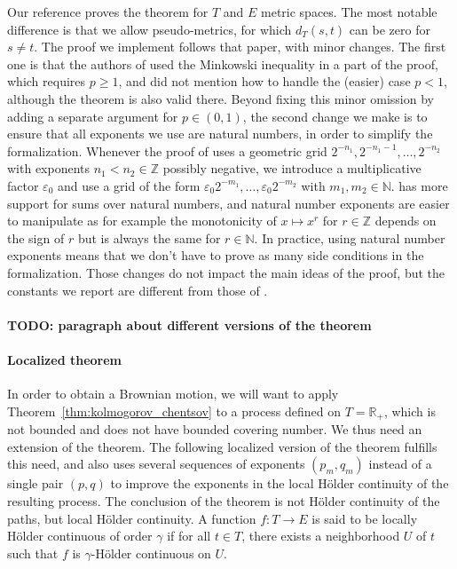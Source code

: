 \documentclass[lean]{Draft}
\begin{document}
Our reference \cite{kratschmer2023kolmogorov} proves the theorem for $T$ and $E$ metric spaces.
The most notable difference is that we allow pseudo-metrics, for which $d_T(s, t)$ can be zero for $s \ne t$.
The proof we implement follows that paper, with minor changes.
The first one is that the authors of \cite{kratschmer2023kolmogorov} used the Minkowski inequality in a part of the proof, which requires $p \ge 1$, and did not mention how to handle the (easier) case $p < 1$, although the theorem is also valid there.
Beyond fixing this minor omission by adding a separate argument for $p \in (0,1)$, the second change we make is to ensure that all exponents we use are natural numbers, in order to simplify the formalization.
Whenever the proof of \cite{kratschmer2023kolmogorov} uses a geometric grid $2^{-n_1}, 2^{-n_1-1},\ldots, 2^{-n_2}$ with exponents $n_1 < n_2 \in \mathbb{Z}$ possibly negative, we introduce a multiplicative factor $\varepsilon_0$ and use a grid of the form $\varepsilon_0 2^{-m_1}, \ldots, \varepsilon_0 2^{-m_2}$ with $m_1, m_2 \in \mathbb{N}$.
\mathlib has more support for sums over natural numbers, and natural number exponents are easier to manipulate as for example the monotonicity of $x \mapsto x^r$ for $r \in \mathbb{Z}$ depends on the sign of $r$ but is always the same for $r \in \mathbb{N}$. In practice, using natural number exponents means that we don't have to prove as many side conditions in the formalization.
Those changes do not impact the main ideas of the proof, but the constants we report are different from those of \cite{kratschmer2023kolmogorov}.


\paragraph{TODO: paragraph about different versions of the theorem}



\paragraph{Localized theorem}

In order to obtain a Brownian motion, we will want to apply Theorem~\ref{thm:kolmogorov_chentsov} to a process defined on $T = \mathbb{R}_+$, which is not bounded and does not have bounded covering number.
We thus need an extension of the theorem.
The following localized version of the theorem fulfills this need, and also uses several sequences of exponents $(p_m, q_m)$ instead of a single pair $(p, q)$ to improve the exponents in the local Hölder continuity of the resulting process.
The conclusion of the theorem is not Hölder continuity of the paths, but local Hölder continuity.
A function $f : T \to E$ is said to be locally Hölder continuous of order $\gamma$ if for all $t \in T$, there exists a neighborhood $U$ of $t$ such that $f$ is $\gamma$-Hölder continuous on $U$.
\end{document}

